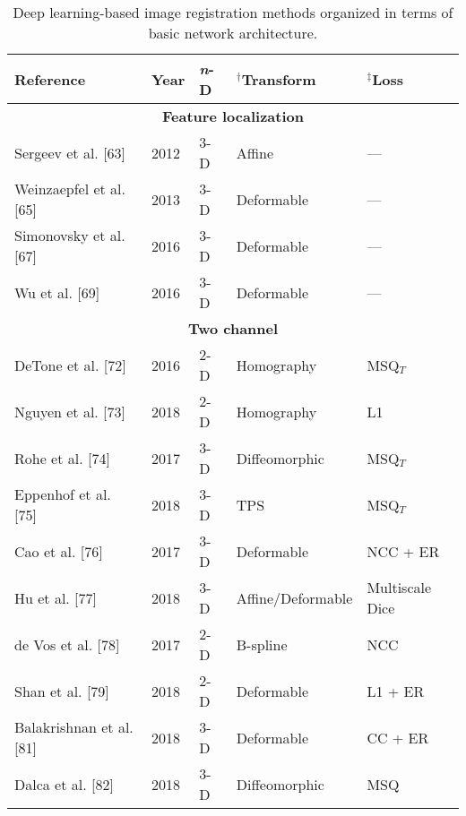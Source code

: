 \begin{table}[!htb]
\centering
\caption{Deep learning-based image registration methods organized in terms of basic
         network architecture.}
\label{table:methods}
\begin{tabular*}{\textwidth}{l@{\extracolsep{\fill}}l@{\extracolsep{\fill}}l@{\extracolsep{\fill}}ll}
\toprule
\midrule
\textbf{Reference} & \textbf{Year} & \textbf{\textit{n}-D} & $^\dagger$\textbf{Transform} & $^\ddagger$\textbf{Loss} \\
\midrule
\midrule
\multicolumn{5}{c}{\textbf{Feature localization}}
  \vspace{0.25cm} \\
  Sergeev et al. [63] & 2012 & 3-D & Affine & --- \\
  Weinzaepfel et al. [65] & 2013 & 3-D & Deformable & --- \\
  Simonovsky et al. [67] & 2016 & 3-D & Deformable & --- \\
  Wu et al. [69] & 2016 & 3-D & Deformable & --- \\
\midrule
\multicolumn{5}{c}{\textbf{Two channel}}
  \vspace{0.25cm} \\
  DeTone et al. [72] & 2016 & 2-D & Homography & MSQ$_T$ \\ %
  Nguyen et al. [73] & 2018 & 2-D & Homography & L1 \\
  Rohe et al. [74] & 2017 & 3-D & Diffeomorphic & MSQ$_T$ \\  %
  Eppenhof et al. [75] & 2018 & 3-D & TPS & MSQ$_T$ \\       %
  Cao et al. [76] & 2017 & 3-D & Deformable & NCC + ER \\
  Hu et al. [77] & 2018 & 3-D & Affine/Deformable & Multiscale Dice \\
  de Vos et al. [78] & 2017 & 2-D & B-spline & NCC \\
  Shan et al. [79] & 2018 & 2-D & Deformable & L1 + ER \\
  Balakrishnan et al. [81] & 2018 & 3-D & Deformable & CC + ER \\
  Dalca et al. [82] & 2018 & 3-D & Diffeomorphic & MSQ \\

\end{tabular*}
\end{table}
